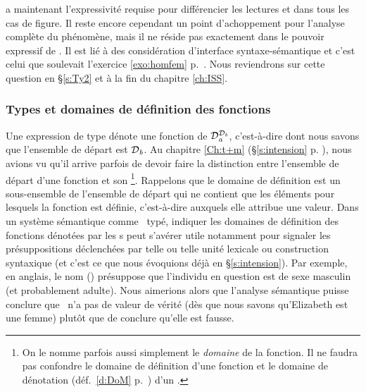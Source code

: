 {\LO} a maintenant l'expressivité requise pour différencier les lectures  et  dans tous les cas de figure.  Il reste encore cependant un point d'achoppement pour l'analyse complète du phénomène, mais il ne réside pas exactement dans le pouvoir expressif de {\LO}.  Il est lié à des considération d'interface syntaxe-sémantique et c'est celui que soulevait l'exercice \ref{exo:homfem} p.~\pageref{exo:homfem}. 
Nous reviendrons sur cette question en \S\ref{s:Ty2} et à la fin du chapitre \ref{ch:ISS}.


\subsubsection{Types et domaines de définition des fonctions}
\label{sss:DomDef}

Une expression de type  dénote une fonction de $\mathcal{D}_{\mathit{a}}^{\mathcal{D}_{\mathit{b}}}$, c'est-à-dire dont nous savons que l'ensemble de départ est $\mathcal{D}_{\mathit{b}}$.  
Au chapitre \ref{Ch:t+m} (\S\ref{s:intension} p. \pageref{H:DomDefF}), nous avions vu qu'il arrive parfois de devoir  faire la distinction entre l'ensemble de départ d'une fonction et son \footnote{On le nomme parfois aussi simplement le \emph{domaine} de la fonction.  Il ne faudra pas confondre le domaine de définition d'une fonction et le domaine de dénotation (déf.~\ref{d:DoM} p.~\pageref{d:DoM}) d'un \lterme.}.  
Rappelons que le domaine de définition est un sous-ensemble de l'ensemble de départ qui ne contient que les éléments pour lesquels la fonction est définie, c'est-à-dire auxquels elle attribue une valeur.  %
Dans un système sémantique comme \LO\ typé, indiquer les domaines de définition des fonctions dénotées par les \lterme s peut s'avérer utile notamment pour signaler les présuppositions déclenchées par telle ou telle unité lexicale ou construction syntaxique (et c'est ce que nous évoquions déjà en \S\ref{s:intension}).  
Par exemple, en anglais, le nom  () présuppose que l'individu en question est de sexe masculin (et probablement adulte).  
Nous aimerions alors que l'analyse sémantique puisse conclure que \Next\ n'a pas de valeur de vérité (dès que nous savons qu'Elizabeth est une femme) plutôt que de conclure qu'elle est fausse.


